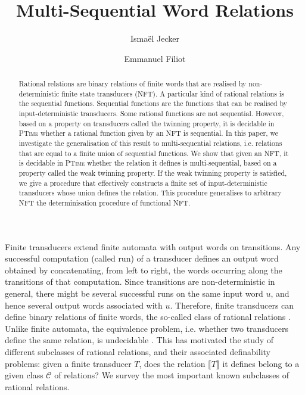 \documentclass[envcountsame]{llncs}
\title{
Multi-Sequential Word Relations}
\author{
Ismaël Jecker\and
Emmanuel Filiot
}
\institute{
Université Libre de Bruxelles}
\newcommand\inter[1]{\llbracket #1 \rrbracket}
\begin{document}
\maketitle

\begin{abstract}
    Rational relations are binary relations of finite words that are
    realised by non-deterministic finite state transducers (NFT). 
    A particular kind of rational relations is the sequential
    functions. Sequential functions are the functions that can be
    realised by input-deterministic transducers. Some rational
    functions are not sequential. However, based on a property on
    transducers called the twinning property, it is decidable in
    \textsc{PTime} whether a rational function given by an NFT is
    sequential. In this paper, we investigate the
    generalisation of this result to multi-sequential relations,
    i.e. relations that are equal to a finite union of sequential
    functions. We show that given an NFT, it is decidable in
    \textsc{PTime} whether the relation it defines is
    multi-sequential, based on a property called the weak twinning
    property. If the weak twinning property is satisfied, we give a procedure that effectively
    constructs a finite set of input-deterministic transducers whose
    union defines the relation. This procedure generalises to
    arbitrary NFT the determinisation procedure of 
    functional NFT.
\end{abstract}



Finite transducers extend finite automata with 
output words on transitions. Any successful computation (called run) of a
transducer defines an output word obtained by concatenating, from
left to right, the words occurring along the transitions of that
computation. Since transitions are non-deterministic in general, there
might be several successful runs on the same input word $u$, and hence 
several output words associated with $u$. Therefore, finite
transducers can define binary relations of finite words, the so-called
class of rational relations \cite{Elgot:Mezei:ibmjrd:1965,berstel2009}.
Unlike finite automata, the equivalence problem, i.e. whether two transducers define the same
relation, is undecidable \cite{DBLP:journals/jacm/Griffiths68}. This has
motivated the study of different subclasses of rational relations, and
their associated definability problems: given a finite transducer $T$,
does the relation $\inter{T}$ it defines belong to a given class
$\mathcal{C}$ of relations? We survey the most
important known subclasses of rational relations. 
\end{document}
